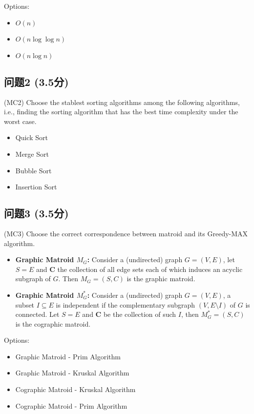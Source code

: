 \documentclass[11pt, a4paper]{article}
\begin{document}
Options:
\begin{itemize}
    \item \(O(n)\)
    \item \(O(n \log \log n)\)
    \item \(O(n \log n)\)
\end{itemize}

\subsection*{问题2 (3.5分)}
(MC2) Choose the stablest sorting algorithms among the following algorithms, i.e., finding the sorting algorithm that has the best time complexity under the worst case.

\begin{itemize}
    \item Quick Sort
    \item Merge Sort
    \item Bubble Sort
    \item Insertion Sort
\end{itemize}

\subsection*{问题3 (3.5分)}
(MC3) Choose the correct correspondence between matroid and its Greedy-MAX algorithm.

\begin{itemize}
    \item \textbf{Graphic Matroid \(M_G\):} Consider a (undirected) graph \(G = (V,E)\), let \(S = E\) and \(\mathbf{C}\) the collection of all edge sets each of which induces an acyclic subgraph of \(G\). Then \(M_G = (S,C)\) is the graphic matroid.
    \item \textbf{Graphic Matroid \(M_G^*\):} Consider a (undirected) graph \(G = (V,E)\), a subset \(I \subseteq E\) is independent if the complementary subgraph \((V, E \setminus I)\) of \(G\) is connected. Let \(S = E\) and \(\mathbf{C}\) be the collection of such \(I\), then \(M_G^* = (S,C)\) is the cographic matroid.
\end{itemize}

Options:
\begin{itemize}
    \item Graphic Matroid - Prim Algorithm
    \item Graphic Matroid - Kruskal Algorithm
    \item Cographic Matroid - Kruskal Algorithm
    \item Cographic Matroid - Prim Algorithm
\end{itemize}
\end{document}

